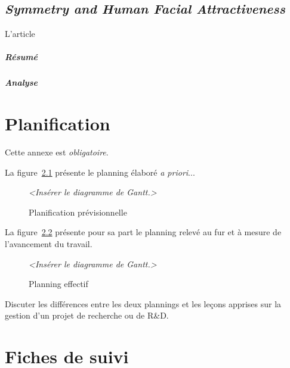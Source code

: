 \documentclass[11pt, french]{report-rd-info}
\begin{document}
\section{\emph{Symmetry and Human Facial Attractiveness}}
L'article \cite{Perrett1999} 

\paragraph{Résumé}

\paragraph{Analyse}











\chapter{Planification}

Cette annexe est \emph{obligatoire}.

La figure~\ref{fig:PlanningPrevisionnel} présente le planning élaboré \emph{a priori}...

\begin{figure}
	\centering
		\emph{<Insérer le diagramme de Gantt.>}
	\caption{Planification prévisionnelle}
	\label{fig:PlanningPrevisionnel}
\end{figure}

La figure~\ref{fig:PlanningEffectif} présente pour sa part le planning relevé au fur et à mesure de l'avancement du travail.

\begin{figure}
	\centering
		\emph{<Insérer le diagramme de Gantt.>}
	\caption{Planning effectif}
	\label{fig:PlanningEffectif}
\end{figure}

Discuter les différences entre les deux plannings et les leçons apprises sur la gestion d'un projet de recherche ou de R\&D.

\chapter{Fiches de suivi}
\label{ann:FichesSuivi}
\end{document}
